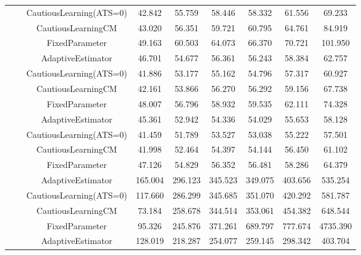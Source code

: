 \begin{table}[!h]
\begin{tabular}[t]{ccccccccc}
 &  & CautiousLearning(ATS=0) & 42.842 & 55.759 & 58.446 & 58.332 & 61.556 & 69.233\\

 &  & CautiousLearningCM & 43.020 & 56.351 & 59.721 & 60.795 & 64.761 & 84.919\\

 & \multirow[t]{-4}{*}{\centering\arraybackslash 1.00} & FixedParameter & 49.163 & 60.503 & 64.073 & 66.370 & 70.721 & 101.950\\
\cmidrule{2-9}
 &  & AdaptiveEstimator & 46.701 & 54.677 & 56.361 & 56.243 & 58.384 & 62.757\\

 &  & CautiousLearning(ATS=0) & 41.886 & 53.177 & 55.162 & 54.796 & 57.317 & 60.927\\

 &  & CautiousLearningCM & 42.161 & 53.866 & 56.270 & 56.292 & 59.156 & 67.738\\

 & \multirow[t]{-4}{*}{\centering\arraybackslash 1.25} & FixedParameter & 48.007 & 56.796 & 58.932 & 59.535 & 62.111 & 74.328\\
\cmidrule{2-9}
 &  & AdaptiveEstimator & 45.361 & 52.942 & 54.336 & 54.029 & 55.653 & 58.128\\

 &  & CautiousLearning(ATS=0) & 41.459 & 51.789 & 53.527 & 53.038 & 55.222 & 57.501\\

 &  & CautiousLearningCM & 41.998 & 52.464 & 54.397 & 54.144 & 56.450 & 61.102\\

\multirow[t]{-28}{*}{\centering\arraybackslash 50} & \multirow[t]{-4}{*}{\centering\arraybackslash 1.50} & FixedParameter & 47.126 & 54.829 & 56.352 & 56.481 & 58.286 & 64.379\\
\cmidrule{1-9}
 &  & AdaptiveEstimator & 165.004 & 296.123 & 345.523 & 349.075 & 403.656 & 535.254\\

 &  & CautiousLearning(ATS=0) & 117.660 & 286.299 & 345.685 & 351.070 & 420.292 & 581.787\\

 &  & CautiousLearningCM & 73.184 & 258.678 & 344.514 & 353.061 & 454.382 & 648.544\\

 & \multirow[t]{-4}{*}{\centering\arraybackslash 0.25} & FixedParameter & 95.326 & 245.876 & 371.261 & 689.797 & 777.674 & 4735.390\\
\cmidrule{2-9}
 &  & AdaptiveEstimator & 128.019 & 218.287 & 254.077 & 259.145 & 298.342 & 403.704\\


\end{tabular}
\end{table}
